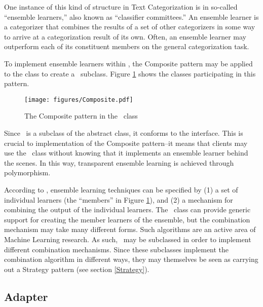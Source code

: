One instance of this kind of structure in Text Categorization is in
so-called ``ensemble learners,'' also known as ``classifier
committees.''  An ensemble learner is a categorizer that combines the
results of a set of other categorizers in some way to arrive at a
categorization result of its own. \cite[p. 30]{sebastiani:02} Often,
an ensemble learner may outperform each of its constituent members on
the general categorization task.  \cite{tumer:98}

To implement ensemble learners within \aicat, the Composite
pattern may be applied to the  class to create a
\ensemble\ subclass.  Figure \ref{Composite-ensemble}
shows the classes participating in this pattern.

\begin{figure}
\texttt{[image: figures/Composite.pdf]}
\caption{The Composite pattern in the \ensemble\ class}
\label{Composite-ensemble}
\end{figure}

Since \ensemble\ is a subclass of the abstract
 class, it conforms to the  interface.
This is crucial to implementation of the Composite pattern--it means
that clients may use the \ensemble\ class without
knowing that it implements an ensemble learner behind the scenes.  In
this way, transparent ensemble learning is achieved through
polymorphism.

According to \cite[p. 30]{sebastiani:02}, ensemble learning techniques
can be specified by (1) a set of individual learners (the ``members''
in Figure \ref{Composite-ensemble}), and (2) a mechanism for combining
the output of the individual learners.  The \ensemble\
class can provide generic support for creating the member learners of
the ensemble, but the combination mechanism may take many different
forms.  Such algorithms are an active area of Machine Learning
research.  As such, \ensemble\ may be subclassed in
order to implement different combination mechanisms.  Since these
subclasses implement the combination algorithm in different ways, they
may themselves be seen as carrying out a Strategy pattern (see section
\ref{Strategy}).


\subsection{Adapter}

